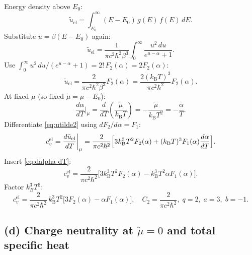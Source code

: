 \documentclass[11pt]{article}
\begin{document}
Energy density above $E_0$:
\begin{equation}
\tilde u_{\mathrm{el}}=\int_{E_{0}}^{\infty}(E-E_{0})\,g(E)\,f(E)\,dE.
\label{eq:utilde}
\end{equation}
Substitute $u=\beta(E-E_0)$ again:
\begin{equation}
\tilde u_{\mathrm{el}}=\frac{1}{\pi c^{2}\hbar^{2}\beta^{3}}\int_{0}^{\infty}\frac{u^{2}\,du}{e^{u-\alpha}+1}.
\end{equation}
Use $\int_0^\infty u^2\,du/(e^{u-\alpha}+1)=2!\,F_2(\alpha)=2F_2(\alpha)$:
\begin{equation}
\tilde u_{\mathrm{el}}=\frac{2}{\pi c^{2}\hbar^{2}\beta^{3}}F_{2}(\alpha)=\frac{2(k_{\mathrm B}T)^{3}}{\pi c^{2}\hbar^{2}}F_{2}(\alpha).
\label{eq:utilde2}
\end{equation}
At fixed $\mu$ (so fixed $\tilde\mu=\mu-E_0$):
\begin{equation}
\frac{d\alpha}{dT}\bigg|_{\mu}=\frac{d}{dT}\!\left(\frac{\tilde\mu}{k_{\mathrm B}T}\right)=-\frac{\tilde\mu}{k_{\mathrm B}T^{2}}=-\frac{\alpha}{T}.
\label{eq:dalpha-dT}
\end{equation}
Differentiate \eqref{eq:utilde2} using $dF_2/d\alpha=F_1$:
\begin{equation}
c_{v}^{\mathrm{el}}=\frac{d\tilde u_{\mathrm{el}}}{dT}\bigg|_{\mu}=\frac{2}{\pi c^{2}\hbar^{2}}\Bigl[3k_{\mathrm B}^{3}T^{2}F_{2}(\alpha)+(k_{\mathrm B}T)^{3}F_{1}(\alpha)\frac{d\alpha}{dT}\Bigr].
\end{equation}
Insert \eqref{eq:dalpha-dT}:
\begin{equation}
c_{v}^{\mathrm{el}}=\frac{2}{\pi c^{2}\hbar^{2}}\bigl[3k_{\mathrm B}^{3}T^{2}F_{2}(\alpha)-k_{\mathrm B}^{3}T^{2}\alpha F_{1}(\alpha)\bigr].
\end{equation}
Factor $k_B^3 T^2$:
\begin{equation}
\boxed{\,c_{v}^{\mathrm{el}}=\frac{2}{\pi c^{2}\hbar^{2}}\,k_{\mathrm B}^{3}T^{2}\bigl[3F_{2}(\alpha)-\alpha F_{1}(\alpha)\bigr],\quad C_{2}=\frac{2}{\pi c^{2}\hbar^{2}},\;q=2,\;a=3,\;b=-1.\,}
\label{eq:cv-final}
\end{equation}

\subsection*{(d) Charge neutrality at $\tilde\mu=0$ and total specific heat}
\end{document}
